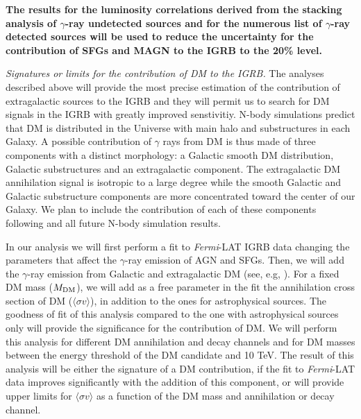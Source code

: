 \documentclass[12 pt]{article}
\begin{document}
{\bf The results for the luminosity correlations derived from the stacking analysis of $\gamma$-ray undetected sources and for the numerous list of $\gamma$-ray detected sources will be used to reduce the uncertainty for the contribution of SFGs and MAGN to the IGRB to the 20\% level.}



{\it Signatures or limits for the contribution of DM to the IGRB.}
The analyses described above will provide the most precise estimation of the contribution of extragalactic sources to the IGRB and they will permit us to search for DM signals in the IGRB with greatly improved senstivitiy. 
N-body simulations predict that DM is distributed in the Universe with main halo and substructures in each Galaxy.
A possible contribution of $\gamma$ rays from DM is thus made of three components with a distinct morphology: a Galactic smooth DM distribution, Galactic substructures and an extragalactic component.
The extragalactic DM annihilation signal is isotropic to a large degree while the smooth Galactic and Galactic substructure components are more concentrated toward the center of our Galaxy.
We plan to include the contribution of each of these components following \cite{Cirelli:2010xx,Ajello:2015mfa} and all future N-body simulation results.

In our analysis we will first perform a fit to {\it Fermi}-LAT IGRB data changing the parameters that affect the $\gamma$-ray emission of AGN and SFGs. 
Then, we will add the $\gamma$-ray emission from Galactic and extragalactic DM (see, e.g, \cite{DiMauro:2015tfa,Ajello:2015mfa}). For a fixed DM mass ($M_{\rm{DM}}$), we will add as a free parameter in the fit the annihilation cross section of DM ($\langle \sigma v \rangle$), in addition to the ones for astrophysical sources.
The goodness of fit of this analysis compared to the one with astrophysical sources only will provide the significance for the contribution of DM.
We will perform this analysis for different DM annihilation and decay channels and for DM masses between the energy threshold of the DM candidate and 10 TeV.
The result of this analysis will be either the signature of a DM contribution, if the fit to {\it Fermi}-LAT data improves significantly with the addition of this component, or will provide upper limits for $\langle \sigma v \rangle$ as a function of the DM mass and annihilation or decay channel.
\end{document}
